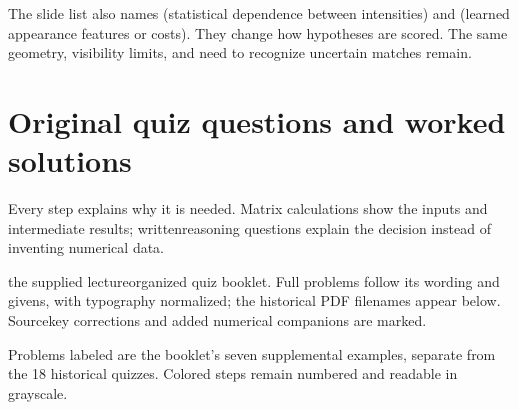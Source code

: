 \documentclass[letterpaper,11pt,english,openany,oneside]{jupyterBook}
\begin{document}
\sphinxAtStartPar
The slide list also names  (statistical dependence between intensities) and  (learned appearance features or costs). They change how hypotheses are scored. The same geometry, visibility limits, and need to recognize uncertain matches remain.

\sphinxstepscope


\section{Original quiz questions and worked solutions}
\label{\detokenize{lectures/lecture04/quiz-workbook:original-quiz-questions-and-worked-solutions}}\label{\detokenize{lectures/lecture04/quiz-workbook:lec04-quiz-workbook}}\label{\detokenize{lectures/lecture04/quiz-workbook::doc}}
\sphinxAtStartPar
{} Every step explains why it is needed. Matrix calculations show the inputs and intermediate results; written\sphinxhyphen{}reasoning questions explain the decision instead of inventing numerical data.

\sphinxAtStartPar
{} the supplied lecture\sphinxhyphen{}organized quiz booklet. Full problems follow its wording and givens, with typography normalized; the historical PDF filenames appear below. Source\sphinxhyphen{}key corrections and added numerical companions are marked.

\sphinxAtStartPar
{} Problems labeled  are the booklet’s seven supplemental examples, separate from the 18 historical quizzes. Colored steps remain numbered and readable in grayscale.
\end{document}
